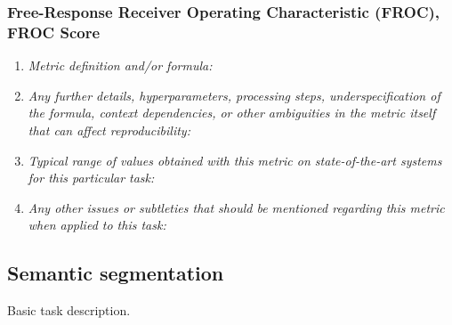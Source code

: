\documentclass[a4paper,11pt]{article}
\begin{document}
        \subsubsection{Free-Response Receiver Operating Characteristic (FROC), FROC Score}
            \begin{enumerate}[label=\alph*.]
                \item \textit{Metric definition and/or formula:}
                \bigskip
                \item \textit{Any further details, hyperparameters, processing steps, underspecification of the formula, context dependencies, or other ambiguities in the metric itself that can affect reproducibility:}
                \bigskip
                \item \textit{Typical range of values obtained with this metric on state-of-the-art systems for this particular task:}
                \bigskip
                \item \textit{Any other issues or subtleties that should be mentioned regarding this metric when applied to this task:}
                \bigskip
            \end{enumerate}

    \subsection{Semantic segmentation}
        Basic task description.
\end{document}
